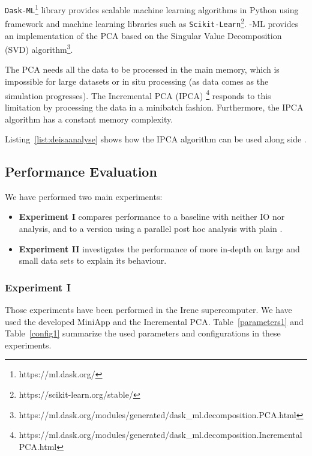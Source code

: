 \texttt{Dask-ML}\footnote{https://ml.dask.org/} library provides scalable machine learning algorithms in Python  using \dask framework and machine learning libraries such as \texttt{Scikit-Learn}\footnote{https://scikit-learn.org/stable/}. \dask-ML provides an implementation of the PCA based on the Singular Value Decomposition (SVD) algorithm\footnote{https://ml.dask.org/modules/generated/dask\_ml.decomposition.PCA.html}.

The PCA needs all the data to be processed in the main memory, which is impossible for large datasets or in situ processing (as data comes as the simulation progresses). The Incremental PCA (IPCA) \footnote{https://ml.dask.org/modules/generated/dask\_ml.decomposition.IncrementalPCA.html} responds to this limitation by processing the data in a minibatch fashion. Furthermore, the IPCA algorithm has a constant memory complexity.    

Listing~\ref{list:deisaanalyse} shows how the IPCA algorithm can be used along side \deisa.

\subsection{Performance Evaluation}

We have performed two main experiments:
\begin{itemize}
    \item \textbf{Experiment I} compares \deisa performance to a baseline with neither IO nor analysis, and to a version using a parallel post hoc analysis with plain \dask.
    \item \textbf{Experiment II} investigates the performance of \deisa more in-depth on large and small data sets to explain its behaviour.
\end{itemize}

\subsubsection{Experiment I}\label{XP1}
Those experiments have been performed in the Irene supercomputer. We have used the developed MiniApp and the Incremental PCA. Table~\ref{parameters1}  and Table~\ref{config1} summarize the used parameters and configurations in these experiments.


